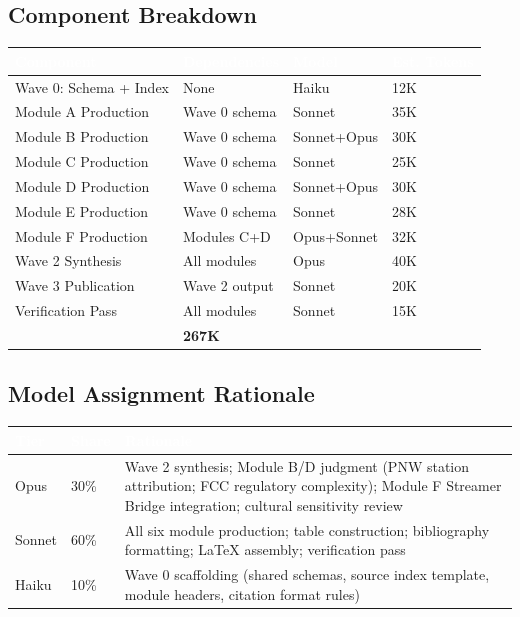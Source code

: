 \documentclass[11pt,letterpaper]{article}
\newcommand{\tableheader}[1]{\textbf{\sffamily\textcolor{white}{#1}}}
\begin{document}
\subsection{Component Breakdown}

\begin{center}
\begin{tabularx}{\textwidth}{L{3cm}L{2.5cm}L{2cm}C{1.5cm}}
\toprule
{}
\tableheader{Component} & \tableheader{Dependencies} & \tableheader{Model} & \tableheader{Est. Tokens} \\
\midrule
Wave 0: Schema + Index & None & Haiku & 12K \\
Module A Production & Wave 0 schema & Sonnet & 35K \\
Module B Production & Wave 0 schema & Sonnet+Opus & 30K \\
Module C Production & Wave 0 schema & Sonnet & 25K \\
Module D Production & Wave 0 schema & Sonnet+Opus & 30K \\
Module E Production & Wave 0 schema & Sonnet & 28K \\
Module F Production & Modules C+D & Opus+Sonnet & 32K \\
Wave 2 Synthesis & All modules & Opus & 40K \\
Wave 3 Publication & Wave 2 output & Sonnet & 20K \\
Verification Pass & All modules & Sonnet & 15K \\
\midrule
{}
 & \textbf{267K} \\
\bottomrule
\end{tabularx}
\end{center}

\subsection{Model Assignment Rationale}

\begin{center}
\begin{tabularx}{\textwidth}{L{2cm}C{1.5cm}X}
\toprule
{}
\tableheader{Tier} & \tableheader{Share} & \tableheader{Rationale} \\
\midrule
Opus & 30\% & Wave 2 synthesis; Module B/D judgment (PNW station attribution; FCC regulatory complexity); Module F Streamer Bridge integration; cultural sensitivity review \\
Sonnet & 60\% & All six module production; table construction; bibliography formatting; LaTeX assembly; verification pass \\
Haiku & 10\% & Wave 0 scaffolding (shared schemas, source index template, module headers, citation format rules) \\
\bottomrule
\end{tabularx}
\end{center}
\end{document}
